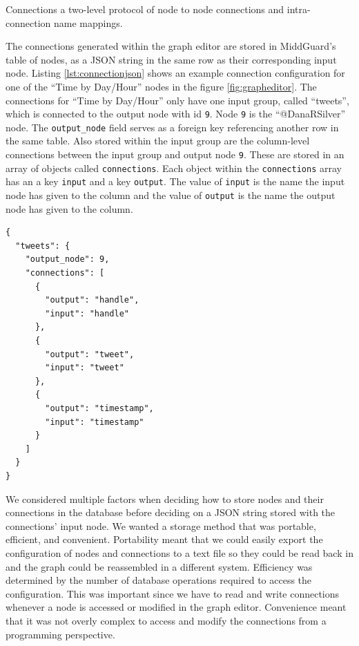 \documentclass[midd]{thesis}
\begin{document}
Connections a two-level protocol of node to node connections and
intra-connection name mappings.

The connections generated within the graph editor are stored in MiddGuard's
table of nodes, as a JSON string in the same row as their corresponding input
node. Listing \ref{lst:connectionjson} shows an example connection configuration
for one of the ``Time by Day/Hour'' nodes in the figure \ref{fig:grapheditor}.
The connections for ``Time by Day/Hour'' only have one input group, called
``tweets'', which is connected to the output node with id \texttt{9}. Node
\texttt{9} is the ``@DanaRSilver'' node. The \texttt{output\_node} field serves
as a foreign key referencing another row in the same table. Also stored within
the input group are the column-level connections between the input group and
output node \texttt{9}. These are stored in an array of objects called
\texttt{connections}. Each object within the \texttt{connections} array has an a
key \texttt{input} and a key \texttt{output}. The value of \texttt{input} is the
name the input node has given to the column and the value of \texttt{output} is
the name the output node has given to the column.

\begin{lstlisting}[caption={A node's connection configuration. The node has a connection from its input group ``tweets'' to the node with id 9.}, captionpos=b, label={lst:connectionjson}]
{
  "tweets": {
    "output_node": 9,
    "connections": [
      {
        "output": "handle",
        "input": "handle"
      },
      {
        "output": "tweet",
        "input": "tweet"
      },
      {
        "output": "timestamp",
        "input": "timestamp"
      }
    ]
  }
}
\end{lstlisting}

We considered multiple factors when deciding how to store nodes and their
connections in the database before deciding on a JSON string stored with the
connections' input node. We wanted a storage method that was portable,
efficient, and convenient. Portability meant that we could easily export the
configuration of nodes and connections to a text file so they could be read back
in and the graph could be reassembled in a different system. Efficiency was
determined by the number of database operations required to access the
configuration. This was important since we have to read and write connections
whenever a node is accessed or modified in the graph editor. Convenience meant
that it was not overly complex to access and modify the connections from a
programming perspective.
\end{document}
